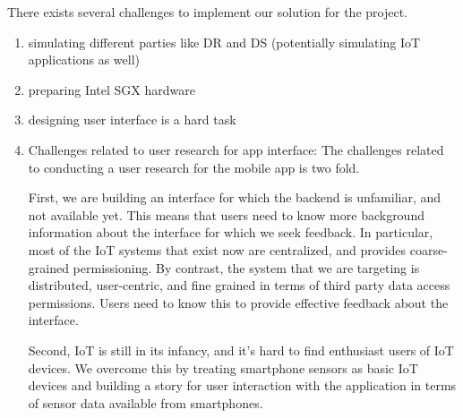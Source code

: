 There exists several challenges to implement our solution for the project.

\begin{enumerate}
\item simulating different parties like DR and DS (potentially simulating IoT applications as well)

\item preparing Intel SGX hardware

\item designing user interface is a hard task

\item Challenges related to user research for app interface: The challenges related to conducting a user research for the mobile app is two fold.

First, we are building an interface for which the backend is unfamiliar, and not available yet. This means that users need to know more background information about the interface for which we seek feedback. In particular, most of the IoT systems that exist now are centralized, and provides coarse-grained permissioning. By contrast, the system that we are targeting is distributed, user-centric, and fine grained in terms of third party data access permissions. Users need to know this to provide effective feedback about the interface.

Second, IoT is still in its infancy, and it's hard to find enthusiast users of IoT devices. We overcome this by treating smartphone sensors as basic IoT devices and building a story for user interaction with the application in terms of sensor data available from smartphones.
\end{enumerate}
